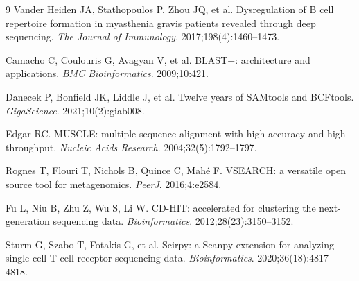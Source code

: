 \documentclass[unnumsec,webpdf,contemporary,large]{oup-authoring-template}
\begin{document}
\begin{thebibliography}{9}
Vander Heiden JA, Stathopoulos P, Zhou JQ, et al. Dysregulation of B cell repertoire formation in myasthenia gravis patients revealed through deep sequencing. \textit{The Journal of Immunology}. 2017;198(4):1460--1473.

Camacho C, Coulouris G, Avagyan V, et al. BLAST+: architecture and applications. \textit{BMC Bioinformatics}. 2009;10:421.

Danecek P, Bonfield JK, Liddle J, et al. Twelve years of SAMtools and BCFtools. \textit{GigaScience}. 2021;10(2):giab008.

Edgar RC. MUSCLE: multiple sequence alignment with high accuracy and high throughput. \textit{Nucleic Acids Research}. 2004;32(5):1792--1797.

Rognes T, Flouri T, Nichols B, Quince C, Mah\'e F. VSEARCH: a versatile open source tool for metagenomics. \textit{PeerJ}. 2016;4:e2584.

Fu L, Niu B, Zhu Z, Wu S, Li W. CD-HIT: accelerated for clustering the next-generation sequencing data. \textit{Bioinformatics}. 2012;28(23):3150--3152.

Sturm G, Szabo T, Fotakis G, et al. Scirpy: a Scanpy extension
for analyzing single-cell T-cell receptor-sequencing data.
\textit{Bioinformatics}. 2020;36(18):4817--4818.

\end{thebibliography}
\end{document}
